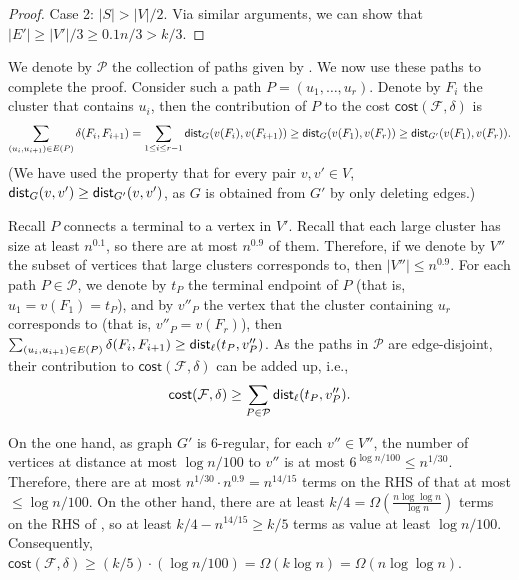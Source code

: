 \documentclass[11pt]{article}
\theoremstyle{definition}
\newcommand{\pset}{{\mathcal{P}}}
\newcommand{\fset}{{\mathcal{F}}}
\newcommand{\dist}{\textnormal{\textsf{dist}}}
\newcommand\vol{\mathsf{cost}}
\newcounter{note}
\begin{document}
\begin{titlepage}
\begin{proof}
Case 2: $|S|> |V|/2$.
Via similar arguments, we can show that $|E'|\ge |V'|/3\ge 0.1n/3> k/3$.
\end{proof}

We denote by $\pset$ the collection of paths given by .
We now use these paths to complete the proof.
%
Consider such a path $P=(u_1,\ldots, u_r)$. Denote by $F_i$ the cluster that contains $u_i$, then the contribution of $P$ to the cost $\vol(\fset,\delta)$ is
\[\sum_{(u_i,u_{i+1})\in E(P)}\delta(F_i,F_{i+1})=\sum_{1\le i\le r-1}\dist_{G}(v(F_i),v(F_{i+1}))\ge \dist_{G}(v(F_1),v(F_{r}))\ge \dist_{G'}(v(F_1),v(F_{r})).\]
(We have used the property that for every pair $v,v'\in V$, $\dist_G(v,v')\ge \dist_{G'}(v,v')$, as $G$ is obtained from $G'$ by only deleting edges.)

Recall $P$ connects a terminal to a vertex in $V'$.
Recall that each large cluster has size at least $n^{0.1}$, so there are at most $n^{0.9}$ of them. Therefore, if we denote by $V''$ the subset of vertices that large clusters corresponds to, then $|V''|\le n^{0.9}$.
For each path $P\in \pset$, we denote by $t_P$ the terminal endpoint of $P$ (that is, $u_1=v(F_1)=t_P$), and by $v''_P$ the vertex that the cluster containing $u_r$ corresponds to (that is, $v''_P=v(F_r)$), then $\sum_{(u_i,u_{i+1})\in E(P)}\delta(F_i,F_{i+1})\ge \dist_{\ell}(t_P,v''_P)$.
As the paths in $\pset$ are edge-disjoint, their contribution to $\vol(\fset,\delta)$ can be added up, i.e., 
\begin{equation}\label{eqn: cost}
\vol(\fset,\delta)\ge \sum_{P\in \pset}\dist_{\ell}(t_P,v''_P).
\end{equation}

On the one hand, as graph $G'$ is $6$-regular, for each $v''\in V''$, the number of vertices at distance at most $\log n/100$ to $v''$ is at most $6^{\log n/100}\le n^{1/30}$. Therefore, there are at most $n^{1/30}\cdot n^{0.9}=n^{14/15}$ terms on the RHS of  that at most $\le \log n/100$.
On the other hand, there are at least $k/4=\Omega(\frac{n\log \log n}{\log n})$ terms on the RHS of , so at least $k/4-n^{14/15}\ge k/5$ terms as value at least $\log n/100$. Consequently, $\vol(\fset,\delta)\ge (k/5)\cdot (\log n/100)=\Omega(k \log n)=\Omega(n\log\log n)$.














\end{titlepage}
\end{document}
